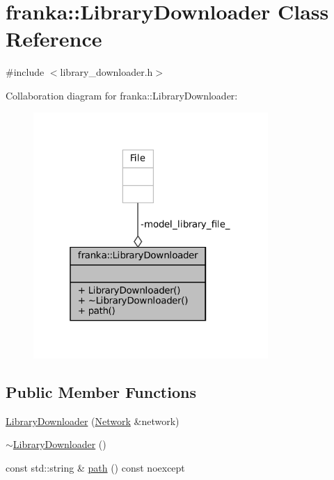 \hypertarget{classfranka_1_1LibraryDownloader}{}\section{franka\+:\+:Library\+Downloader Class Reference}
\label{classfranka_1_1LibraryDownloader}


{\ttfamily \#include $<$library\+\_\+downloader.\+h$>$}



Collaboration diagram for franka\+:\+:Library\+Downloader\+:
\nopagebreak
\begin{figure}[H]
\begin{center}
\leavevmode
\includegraphics[width=253pt]{classfranka_1_1LibraryDownloader__coll__graph}
\end{center}
\end{figure}
\subsection*{Public Member Functions}
\begin{DoxyCompactItemize}
\item 
\hyperlink{classfranka_1_1LibraryDownloader_acf92ea08d6799c36eb57df91ab876544}{Library\+Downloader} (\hyperlink{classfranka_1_1Network}{Network} \&network)
\item 
\hyperlink{classfranka_1_1LibraryDownloader_a036c9b6d446b873446a41c6ce3feffbe}{$\sim$\+Library\+Downloader} ()
\item 
const std\+::string \& \hyperlink{classfranka_1_1LibraryDownloader_ac33161b97cad34550de02c67f4feb15c}{path} () const noexcept
\end{DoxyCompactItemize}
